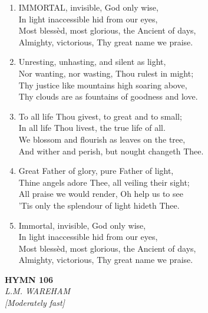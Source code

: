 \documentclass[11pt,a4paper]{article}
\begin{document}
\begin{enumerate}
    \item IMMORTAL, invisible, God only wise, \\
        In light inaccessible hid from our eyes, \\
        Most bless\`ed, most glorious, the Ancient of days, \\
        Almighty, victorious, Thy great name we praise.

    \item Unresting, unhasting, and silent as light, \\
        Nor wanting, nor wasting, Thou rulest in might; \\
        Thy justice like mountains high soaring above, \\
        Thy clouds are as fountains of goodness and love.

    \item To all life Thou givest, to great and to small; \\
        In all life Thou livest, the true life of all. \\
        We blossom and flourish as leaves on the tree, \\
        And wither and perish, but nought changeth Thee.

    \item Great Father of glory, pure Father of light, \\
        Thine angels adore Thee, all veiling their sight; \\
        All praise we would render, Oh help us to see \\
        'Tis only the splendour of light hideth Thee.

    \item Immortal, invisible, God only wise, \\
        In light inaccessible hid from our eyes, \\
        Most bless\`ed, most glorious, the Ancient of days, \\
        Almighty, victorious, Thy great name we praise.

\end{enumerate}

\newpage
\begin{center}
    {\Large \textbf{HYMN 106}}
    \\
    \textit{L.M. WAREHAM}
    \\
    \textit{\small [Moderately fast]}
\end{center}
\vspace{1em}
\end{document}
